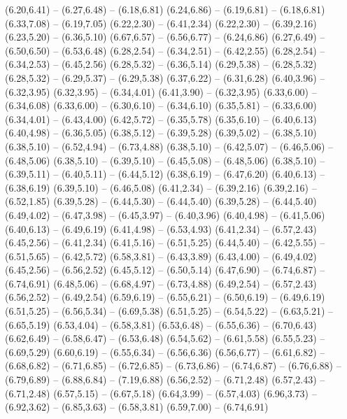 {  (6.20,6.41) -- (6.27,6.48) -- (6.18,6.81)
  (6.24,6.86) -- (6.19,6.81) -- (6.18,6.81)
  (6.33,7.08) -- (6.19,7.05)
  (6.22,2.30) -- (6.41,2.34)
  (6.22,2.30) -- (6.39,2.16)
  (6.23,5.20) -- (6.36,5.10)
  (6.67,6.57) -- (6.56,6.77) -- (6.24,6.86)
  (6.27,6.49) -- (6.50,6.50) -- (6.53,6.48)
  (6.28,2.54) -- (6.34,2.51) -- (6.42,2.55)
  (6.28,2.54) -- (6.34,2.53) -- (6.45,2.56)
  (6.28,5.32) -- (6.36,5.14)
  (6.29,5.38) -- (6.28,5.32)
  (6.28,5.32) -- (6.29,5.37) -- (6.29,5.38)
  (6.37,6.22) -- (6.31,6.28)
  (6.40,3.96) -- (6.32,3.95)
  (6.32,3.95) -- (6.34,4.01)
  (6.41,3.90) -- (6.32,3.95)
  (6.33,6.00) -- (6.34,6.08)
  (6.33,6.00) -- (6.30,6.10) -- (6.34,6.10)
  (6.35,5.81) -- (6.33,6.00)
  (6.34,4.01) -- (6.43,4.00)
  (6.42,5.72) -- (6.35,5.78)
  (6.35,6.10) -- (6.40,6.13)
  (6.40,4.98) -- (6.36,5.05)
  (6.38,5.12) -- (6.39,5.28)
  (6.39,5.02) -- (6.38,5.10)
  (6.38,5.10) -- (6.52,4.94) -- (6.73,4.88)
  (6.38,5.10) -- (6.42,5.07) -- (6.46,5.06) -- (6.48,5.06)
  (6.38,5.10) -- (6.39,5.10) -- (6.45,5.08) -- (6.48,5.06)
  (6.38,5.10) -- (6.39,5.11) -- (6.40,5.11) -- (6.44,5.12)
  (6.38,6.19) -- (6.47,6.20)
  (6.40,6.13) -- (6.38,6.19)
  (6.39,5.10) -- (6.46,5.08)
  (6.41,2.34) -- (6.39,2.16)
  (6.39,2.16) -- (6.52,1.85)
  (6.39,5.28) -- (6.44,5.30) -- (6.44,5.40)
  (6.39,5.28) -- (6.44,5.40)
  (6.49,4.02) -- (6.47,3.98) -- (6.45,3.97) -- (6.40,3.96)
  (6.40,4.98) -- (6.41,5.06)
  (6.40,6.13) -- (6.49,6.19)
  (6.41,4.98) -- (6.53,4.93)
  (6.41,2.34) -- (6.57,2.43)
  (6.45,2.56) -- (6.41,2.34)
  (6.41,5.16) -- (6.51,5.25)
  (6.44,5.40) -- (6.42,5.55) -- (6.51,5.65) -- (6.42,5.72)
  (6.58,3.81) -- (6.43,3.89)
  (6.43,4.00) -- (6.49,4.02)
  (6.45,2.56) -- (6.56,2.52)
  (6.45,5.12) -- (6.50,5.14)
  (6.47,6.90) -- (6.74,6.87) -- (6.74,6.91)
  (6.48,5.06) -- (6.68,4.97) -- (6.73,4.88)
  (6.49,2.54) -- (6.57,2.43)
  (6.56,2.52) -- (6.49,2.54)
  (6.59,6.19) -- (6.55,6.21) -- (6.50,6.19) -- (6.49,6.19)
  (6.51,5.25) -- (6.56,5.34) -- (6.69,5.38)
  (6.51,5.25) -- (6.54,5.22) -- (6.63,5.21) -- (6.65,5.19)
  (6.53,4.04) -- (6.58,3.81)
  (6.53,6.48) -- (6.55,6.36) -- (6.70,6.43)
  (6.62,6.49) -- (6.58,6.47) -- (6.53,6.48)
  (6.54,5.62) -- (6.61,5.58)
  (6.55,5.23) -- (6.69,5.29)
  (6.60,6.19) -- (6.55,6.34) -- (6.56,6.36)
  (6.56,6.77) -- (6.61,6.82) -- (6.68,6.82) -- (6.71,6.85) -- (6.72,6.85) -- (6.73,6.86) -- (6.74,6.87) -- (6.76,6.88) -- (6.79,6.89) -- (6.88,6.84) -- (7.19,6.88)
  (6.56,2.52) -- (6.71,2.48)
  (6.57,2.43) -- (6.71,2.48)
  (6.57,5.15) -- (6.67,5.18)
  (6.64,3.99) -- (6.57,4.03)
  (6.96,3.73) -- (6.92,3.62) -- (6.85,3.63) -- (6.58,3.81)
  (6.59,7.00) -- (6.74,6.91)
}
